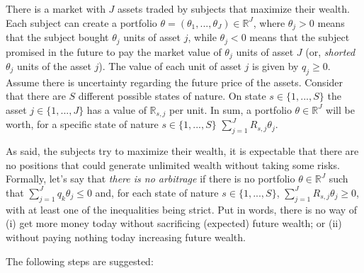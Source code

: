 \documentclass[answers]{exam}
\theoremstyle{definition}
\begin{document}
\begin{questions}
\question There is a market with $J$ assets traded by subjects that maximize their wealth. Each subject can create a portfolio $\theta=(\theta_1,...,\theta_J)\in\mathds{R}^{J}$, where $\theta_j>0$ means that the subject bought $\theta_j$ units of asset $j$, while $\theta_j<0$ means that the subject promised in the future to pay the market value of $\theta_j$ units of asset $J$ (or, \emph{shorted} $\theta_j$ units of the asset $j$). The value of each unit of asset $j$ is given by $q_j\geq 0$. Assume there is uncertainty regarding the future price of the assets. Consider that there are $S$ different possible states of nature. On state $s\in\{1,...,S\}$ the asset $j\in\{1,...,J\}$ has a value of $\mathds{R}_{s,j}$ per unit. In sum, a portfolio $\theta\in\mathds{R}^J$ will be worth, for a specific state of nature $s\in\{1,...,S\}$ $\sum_{j=1}^{J}R_{s,j}\theta_j$.

As said, the subjects try to maximize their wealth, it is expectable that there are no positions that could generate unlimited wealth without taking some risks. Formally, let's say that \emph{there is no arbitrage} if there is no portfolio $\theta\in\mathds{R}^J$ such that $\sum_{j=1}^Jq_k\theta_j\leq0$ and, for each state of nature $s\in\{1,...,S\}$, $\sum_{j=1}^J R_{s,j} \theta_j\geq0$, with at least one of the inequalities being strict. Put in words, there is no way of (i) get more money today without sacrificing (expected) future wealth; or (ii) without paying nothing today increasing future wealth.

The following steps are suggested:

\end{questions}
\end{document}
